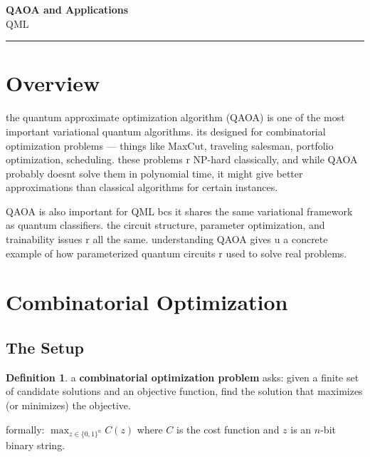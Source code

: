\documentclass[11pt,a4paper]{article}
\theoremstyle{definition}
\newtheorem{definition}{Definition}[section]
\theoremstyle{remark}
\begin{document}
\begin{center}
    {\LARGE \textbf{QAOA and Applications}}\\[8pt]
    {\large QML}\\[12pt]
    \hrule
\end{center}

\vspace{12pt}
\tableofcontents
\newpage

\section{Overview}

the quantum approximate optimization algorithm (QAOA) is one of the most important variational quantum algorithms. its designed for combinatorial optimization problems --- things like MaxCut, traveling salesman, portfolio optimization, scheduling. these problems r NP-hard classically, and while QAOA probably doesnt solve them in polynomial time, it might give better approximations than classical algorithms for certain instances.

QAOA is also important for QML bcs it shares the same variational framework as quantum classifiers. the circuit structure, parameter optimization, and trainability issues r all the same. understanding QAOA gives u a concrete example of how parameterized quantum circuits r used to solve real problems.

\section{Combinatorial Optimization}

\subsection{The Setup}

\begin{definition}
a \textbf{combinatorial optimization problem} asks: given a finite set of candidate solutions and an objective function, find the solution that maximizes (or minimizes) the objective.

formally: $\max_{z \in \{0,1\}^n} C(z)$ where $C$ is the cost function and $z$ is an $n$-bit binary string.
\end{definition}
\end{document}
